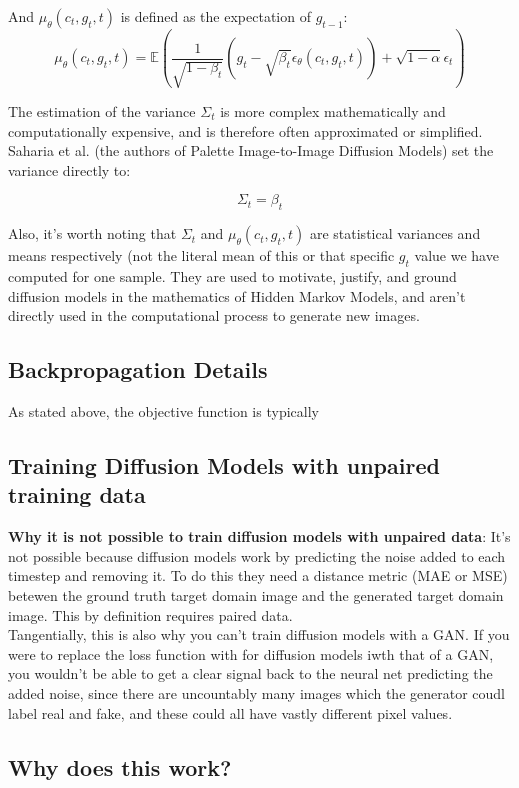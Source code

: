 \documentclass[12pt]{article}
\begin{document}
And \(\mu_\theta(c_t, g_t,t)\) is defined as the expectation of \(g_{t-1}\):
\[\mu_\theta(c_t, g_t,t) = \mathbb{E}\left(\frac{1}{\sqrt{1 - \beta_t}}\left(g_t - \sqrt{\beta_t}\epsilon_\theta(c_t, g_t, t) \right) + \sqrt{1-\alpha}\epsilon_t \right)\]

The estimation of the variance \(\Sigma_t\) is more complex mathematically and computationally expensive, and is therefore often approximated or simplified. Saharia et al. (the authors of Palette Image-to-Image Diffusion Models) set the variance directly to:

\[\Sigma_t = \beta_t\]

Also, it's worth noting that \(\Sigma_t\) and \(\mu_\theta(c_t, g_t,t)\) are statistical variances and means respectively (not the literal mean of this or that specific \(g_t\) value we have computed for one sample. They are used to motivate, justify, and ground diffusion models in the mathematics of Hidden Markov Models, and aren't directly used in the computational process to generate new images.

\subsection{Backpropagation Details}
As stated above, the objective function is typically 
\subsection{Training Diffusion Models with unpaired training data}
\textbf{Why it is not possible to train diffusion models with unpaired data}: It's not possible because diffusion  models work by predicting the noise added to each timestep and removing it. To do this they need a distance metric (MAE or MSE) betewen the ground truth target domain image and the generated target domain image. This by definition requires paired data. \\

Tangentially, this is also why you can't train diffusion models with a GAN. If you were to replace the loss function with for diffusion models iwth that of a GAN, you wouldn't be able to get a clear signal back to the neural net predicting the added noise, since there are uncountably many images which the generator coudl label real and fake, and these could all have vastly different pixel values. 
\subsection{Why does this work?}
\end{document}
